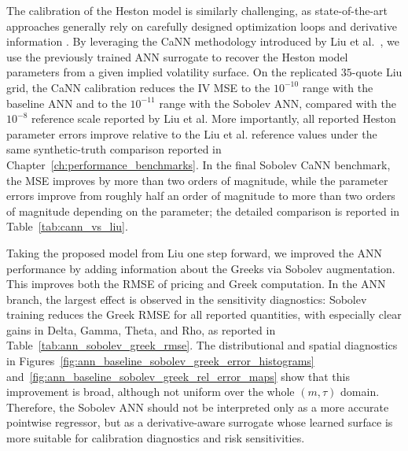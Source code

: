 The calibration of the Heston model is similarly challenging, as state-of-the-art approaches generally rely on carefully designed optimization loops and derivative information \cite{cui2017full_fast_heston}. By leveraging the CaNN methodology introduced by Liu et al.~\cite{liu}, we use the previously trained ANN surrogate to recover the Heston model parameters from a given implied volatility surface. On the replicated \(35\)-quote Liu grid, the CaNN calibration reduces the IV MSE to the \(10^{-10}\) range with the baseline ANN and to the \(10^{-11}\) range with the Sobolev ANN, compared with the \(10^{-8}\) reference scale reported by Liu et al. More importantly, all reported Heston parameter errors improve relative to the Liu et al. reference values under the same synthetic-truth comparison reported in Chapter~\ref{ch:performance_benchmarks}. In the final Sobolev CaNN benchmark, the MSE improves by more than two orders of magnitude, while the parameter errors improve from roughly half an order of magnitude to more than two orders of magnitude depending on the parameter; the detailed comparison is reported in Table~\ref{tab:cann_vs_liu}.

Taking the proposed model from Liu one step forward, we improved the ANN performance by adding information about the Greeks via Sobolev augmentation. This improves both the RMSE of pricing and Greek computation. In the ANN branch, the largest effect is observed in the sensitivity diagnostics: Sobolev training reduces the Greek RMSE for all reported quantities, with especially clear gains in Delta, Gamma, Theta, and Rho, as reported in Table~\ref{tab:ann_sobolev_greek_rmse}. The distributional and spatial diagnostics in Figures~\ref{fig:ann_baseline_sobolev_greek_error_histograms} and~\ref{fig:ann_baseline_sobolev_greek_rel_error_maps} show that this improvement is broad, although not uniform over the whole \((m,\tau)\) domain. Therefore, the Sobolev ANN should not be interpreted only as a more accurate pointwise regressor, but as a derivative-aware surrogate whose learned surface is more suitable for calibration diagnostics and risk sensitivities.

